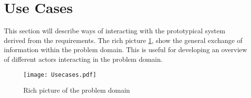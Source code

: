 \section{Use Cases}\label{sub:usecases}

This section will describe ways of interacting with the prototypical system derived from the requirements. The rich picture \cref{fig:richpicture}, show the general exchange of information within the problem domain. This is useful for developing an overview of different actors interacting in the problem domain.

\begin{figure}
  \centering
  \begin{adjustbox}{max width=\textwidth}
    \texttt{[image: Usecases.pdf]}
  \end{adjustbox}
  \caption[Rich picture]{Rich picture of the problem domain}
  \label{fig:richpicture}
\end{figure}
